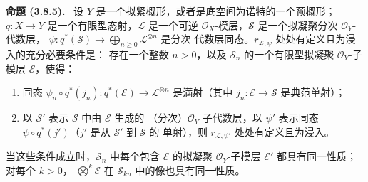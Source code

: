 \documentclass[UTF8,fontset=none,11pt,oneside,openany]{ctexbook}
\newenvironment{proposition}[1][]{\par\medskip\noindent\textbf{命题 (#1).}\ }{\par}
\let\EGAOriginalLabel\label
\renewcommand{\label}[1]{\phantomsection\EGAOriginalLabel{#1}}
\begin{document}
\begin{proposition}[3.8.5]
\label{II.3.8.5-zh}
设 $Y$ 是一个拟紧概形，或者是底空间为诺特的一个预概形；
$q:X\to Y$ 是一个有限型态射，$\mathcal{L}$ 是一个可逆
$\mathcal{O}_X$-模层，$\mathcal{S}$ 是一个拟凝聚分次
$\mathcal{O}_Y$-代数层，
$\psi:q^*(\mathcal{S})\to\bigoplus_{n\geq0}\mathcal{L}^{\otimes n}$ 是分次
代数层同态。$r_{\mathcal{L},\psi}$ 处处有定义且为浸入的充分必要条件是：
存在一个整数 $n>0$，以及 $\mathcal{S}_n$ 的一个有限型拟凝聚
$\mathcal{O}_Y$-子模层 $\mathcal{E}$，使得：
\begin{enumerate}
  \item[a)] 同态
    $\psi_n\circ q^*(j_n):q^*(\mathcal{E})\to\mathcal{L}^{\otimes n}$
    是满射（其中 $j_n:\mathcal{E}\to\mathcal{S}$ 是典范单射）；
  \item[b)] 以 $\mathcal{S}'$ 表示 $\mathcal{S}$ 中由 $\mathcal{E}$ 生成的
    （分次）$\mathcal{O}_Y$-子代数层，以 $\psi'$ 表示同态
    $\psi\circ q^*(j')$（$j'$ 是从 $\mathcal{S}'$ 到 $\mathcal{S}$ 的
    单射），则 $r_{\mathcal{L},\psi'}$ 处处有定义且为浸入。
\end{enumerate}

当这些条件成立时，$\mathcal{S}_n$ 中每个包含 $\mathcal{E}$ 的拟凝聚
$\mathcal{O}_Y$-子模层 $\mathcal{E}'$ 都具有同一性质；对每个 $k>0$，
$\bigotimes^k\mathcal{E}$ 在 $\mathcal{S}_{kn}$ 中的像也具有同一性质。
\end{proposition}
\end{document}
